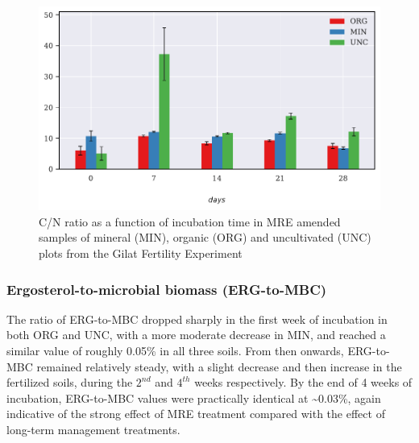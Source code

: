 			\begin{figure}[H]
				\centering
				\includegraphics[scale=0.8, width=\linewidth]{thesis_figures/main_incubation/MRE_treated/C_N_ratio.pdf}
				\caption{C/N ratio  as a function of incubation time in MRE amended samples of mineral (MIN), organic (ORG) and uncultivated (UNC) plots from the Gilat Fertility Experiment}
				\label{fig:c_n_ratio_treated_main}
			\end{figure}





		\subsubsection{Ergosterol-to-microbial biomass (ERG-to-MBC)}

			The ratio of ERG-to-MBC dropped sharply in the first week of incubation in both ORG and UNC, with a more moderate decrease in 	MIN, and reached a similar value of  roughly 0.05\% in all three soils. From then onwards, ERG-to-MBC remained relatively steady, with a slight decrease and then increase in the fertilized soils, during the $2^{nd}$ and $ 4^{th} $ weeks respectively. By the end of 4 weeks of incubation,  ERG-to-MBC values were practically identical at \~{}0.03\%, again indicative of the strong effect of MRE treatment compared with the effect of long-term management treatments.

